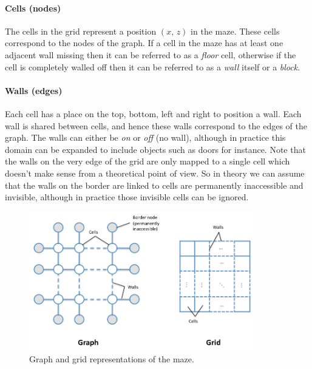 \paragraph{Cells (nodes)} The cells in the grid represent a position $(x,\,z)$ in the maze. These cells correspond to the nodes of the graph. If a cell in the maze has at least one adjacent wall missing then it can be referred to as a {\em floor} cell, otherwise if the cell is completely walled off then it can be referred to as a {\em wall} itself or a {\em block}.

\paragraph{Walls (edges)} Each cell has a place on the top, bottom, left and right to position a wall. Each wall is shared between cells, and hence these walls correspond to the edges of the graph. The walls can either be {\em on} or {\em off} (no wall), although in practice this domain can be expanded to include objects such as doors for instance. Note that the walls on the very edge of the grid are only mapped to a single cell which doesn't make sense from a theoretical point of view. So in theory we can assume that the walls on the border are linked to cells are permanently inaccessible and invisible, although in practice those invisible cells can be ignored.

\begin{figure}[h!]
\centering
 \includegraphics[width=0.87\textwidth]{images/graph-grid.png}
\caption{Graph and grid representations of the maze.}
\end{figure}

